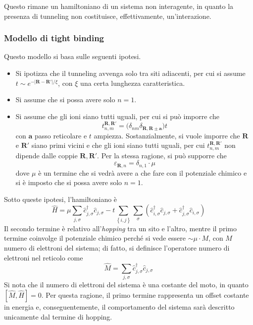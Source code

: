 \documentclass[11pt, a4paper]{scrartcl}
\theoremstyle{style}
\theoremstyle{style1}
\numberwithin{equation}{subsection}
\begin{document}
Questo rimane un hamiltoniano di un sistema non interagente, in quanto la presenza di tunneling non costituisce, effettivamente, un'interazione.
\subsubsection{Modello di tight binding}
Questo modello si basa sulle seguenti ipotesi.
\begin{itemize}
	\item Si ipotizza che il tunneling avvenga solo tra siti adiacenti, per cui si assume $t \sim e^{-\lvert \mathbf{R} -\mathbf{R} ' \rvert / \xi }$, con $\xi $ una certa lunghezza caratteristica.
	\item Si assume che si possa avere solo $n=1$.
	\item Si assume che gli ioni siano tutti uguali, per cui si pu\`o imporre che 
		\[
		t^{\mathbf{R} ,\mathbf{R} '} _{n,m} = \big(\delta _{nm} \delta _{\mathbf{R} , \mathbf{R} \pm \mathbf{a} } \big)t
		\] 
	con $\mathbf{a} $ passo reticolare e $t$ ampiezza. Sostanzialmente, si vuole imporre che $\mathbf{R} $ e $\mathbf{R} '$ siano primi vicini e che gli ioni siano tutti uguali, per cui $t^{\mathbf{R} ,\mathbf{R} '} _{n,m} $ non dipende dalle coppie $\mathbf{R} ,\mathbf{R} '$.
	Per la stessa ragione, si pu\`o supporre che 
	\[
	\varepsilon _{\mathbf{R} ,n} =\delta _{n,1} \cdot \mu 
	\] 
	dove $\mu $ \`e un termine che si vedr\`a avere a che fare con il potenziale chimico e si \`e imposto che si possa avere solo $n=1$.
\end{itemize}
Sotto queste ipotesi, l'hamiltoniano \`e
\begin{equation}
\hat{H} = \mu  \sum_{j,\sigma }^{}  \hat{c}^\dagger _{j,\sigma } \hat{c}_{j,\sigma } - t \sum_{\left\{ i,j \right\} }^{}\sum_{\sigma }^{} \left(\hat{c}^\dagger _{i,\sigma } \hat{c}_{j,\sigma } + \hat{c}^\dagger _{j,\sigma } \hat{c}_{i,\sigma } \right) 
\end{equation}
Il secondo termine \`e relativo all'\textit{hopping} tra un sito e l'altro, mentre il primo termine coinvolge il potenziale chimico perch\'e si vede essere $\sim \mu \cdot M$, con $M$ numero di elettroni del sistema; di fatto, si definisce l'operatore numero di elettroni nel reticolo come
\[
\hat{M}=\sum_{j,\sigma }^{} \hat{c}^\dagger _{j,\sigma } \hat{c}_{j,\sigma } 
\] 
Si nota che il numero di elettroni del sistema \`e una costante del moto, in quanto $[\hat{M},\hat{H}] = 0$.
Per questa ragione, il primo termine rappresenta un offset costante in energia e, conseguentemente, il comportamento del sistema sar\`a descritto unicamente dal termine di hopping.
\end{document}
